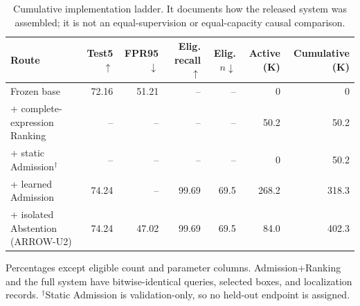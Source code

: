 \begin{table}[t]
\centering
\caption{Cumulative implementation ladder.  It documents how the released
system was assembled; it is not an equal-supervision or equal-capacity causal
comparison.}
\label{tab:supp-cumulative-routes}
\scriptsize
\setlength{\tabcolsep}{4pt}
\begin{tabular}{lrrrrrr}
\toprule
Route & Test5$\uparrow$ & FPR95$\downarrow$ & Elig. recall$\uparrow$ & Elig. $n\downarrow$ & Active (K) & Cumulative (K) \\
\midrule
Frozen base & 72.16 & 51.21 & -- & -- & 0 & 0 \\
+ complete-expression Ranking & -- & -- & -- & -- & 50.2 & 50.2 \\
+ static Admission$^{\dagger}$ & -- & -- & -- & -- & 0 & 50.2 \\
+ learned Admission & 74.24 & -- & 99.69 & 69.5 & 268.2 & 318.3 \\
+ isolated Abstention (ARROW-U2) & 74.24 & 47.02 & 99.69 & 69.5 & 84.0 & 402.3 \\
\bottomrule
\end{tabular}
\parbox{0.97\textwidth}{\scriptsize Percentages except eligible count and
parameter columns. Admission+Ranking and the full system have bitwise-identical
queries, selected boxes, and localization records. $^\dagger$Static Admission
is validation-only, so no held-out endpoint is assigned.}
\end{table}
